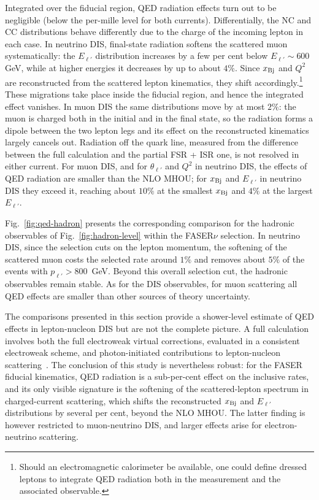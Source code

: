 Integrated over the fiducial region, QED radiation effects turn out to be negligible (below the per-mille level for both currents).  
%
Differentially, the NC and CC distributions behave differently due to the charge of the incoming lepton in each case.
%
In neutrino DIS, final-state radiation softens the scattered muon systematically: the $E_{\ell'}$ distribution increases by a few per cent below $E_{\ell'}\sim 600$ GeV, while at higher energies it decreases by up to about $4\%$.
%
Since $x_{\rm Bj}$ and $Q^2$ are reconstructed from the scattered lepton kinematics, they shift accordingly.\footnote{Should an electromagnetic calorimeter be available, one could define dressed leptons to integrate QED radiation both in the measurement and the associated observable.} 
%
These migrations take place inside the fiducial region, and hence the integrated effect vanishes.
%
In muon DIS the same distributions move by at most $2\%$: the muon is charged both in the initial and in the final state, so the radiation forms a dipole between the two lepton legs and its effect on the reconstructed kinematics largely cancels out.
%
Radiation off the quark line, measured from the difference between the full calculation and the partial FSR + ISR one, is not resolved in either current. 
%
For muon DIS, and for $\theta_{\ell'}$ and $Q^2$ in neutrino DIS, the effects of QED radiation are smaller than the NLO MHOU; for $x_{\rm Bj}$ and $E_{\ell'}$ in neutrino DIS they exceed it, reaching about $10\%$ at the smallest $x_{\rm Bj}$ and $4\%$ at the largest $E_{\ell'}$.

Fig.~\ref{fig:qed-hadron} presents the corresponding comparison for the hadronic observables of Fig.~\ref{fig:hadron-level} within the FASER$\nu$ selection.
%
In neutrino DIS, since the selection cuts on the lepton momentum, the softening of the scattered muon costs the selected rate around $1\%$ and removes about $5\%$ of the events with $p_{\ell'}>800$~GeV.
%
Beyond this overall selection cut, the hadronic observables remain stable.
%
As for the DIS observables, for muon scattering all QED effects are smaller than  other sources of theory uncertainty.

The comparisons presented in this section provide a shower-level estimate of QED effects in lepton-nucleon DIS but are not the complete picture.
%
A full calculation involves both the full electroweak virtual corrections, evaluated in a consistent electroweak scheme, and photon-initiated contributions to lepton-nucleon scattering~\cite{Manohar:2016nzj,Bertone:2017bme,Manohar:2017eqh,Cridge:2021pxm,NNPDF:2024djq}.
%
The conclusion of this study is nevertheless robust: for the FASER fiducial kinematics, QED radiation is a sub-per-cent effect on the inclusive rates, and its only visible signature is the softening of the scattered-lepton spectrum in charged-current scattering, which shifts the reconstructed $x_{\rm Bj}$ and $E_{\ell'}$ distributions by several per cent, beyond the NLO MHOU.
%
The latter finding is however restricted to muon-neutrino DIS, and larger effects arise for electron-neutrino scattering.
